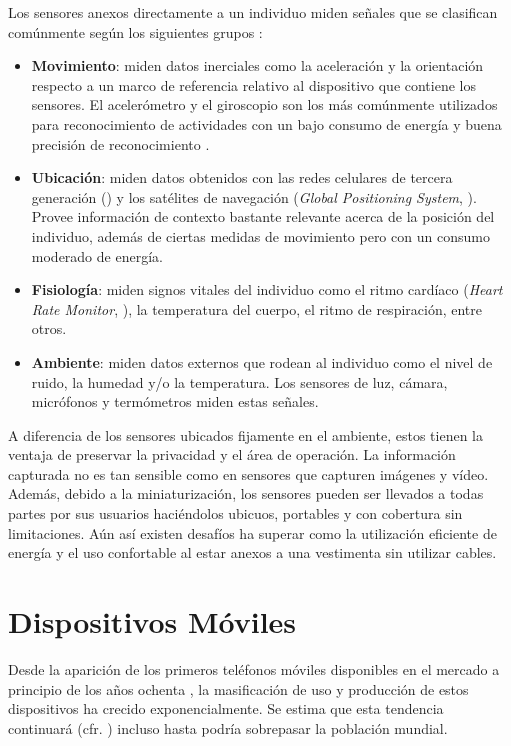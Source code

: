 Los sensores anexos directamente a un individuo miden señales que
se clasifican comúnmente según los siguientes grupos \cite{LaraLabrador2013}:
\begin{itemize}
\item \textbf{Movimiento}: miden datos inerciales como la aceleración y
la orientación respecto a un marco de referencia relativo al dispositivo
que contiene los sensores. El acelerómetro y el giroscopio son los
más comúnmente utilizados para reconocimiento de actividades con un
bajo consumo de energía y buena precisión de reconocimiento \cite{Bao2004,LaraLabrador2012}.
\item \textbf{Ubicación}: miden datos obtenidos con las redes celulares
de tercera generación () y los satélites de navegación (\emph{Global
Positioning System}, ). Provee información de contexto
bastante relevante acerca de la posición del individuo, además de
ciertas medidas de movimiento pero con un consumo moderado de energía.
\item \textbf{Fisiología}: miden signos vitales del individuo como el ritmo
cardíaco (\emph{Heart Rate Monitor},\emph{ }), la temperatura
del cuerpo, el ritmo de respiración, entre otros.
\item \textbf{Ambiente}: miden datos externos que rodean al individuo como
el nivel de ruido, la humedad y/o la temperatura. Los sensores de
luz, cámara, micrófonos y termómetros miden estas señales. 
\end{itemize}
A diferencia de los sensores ubicados fijamente en el ambiente, estos
tienen la ventaja de preservar la privacidad y el área de operación.
La información capturada no es tan sensible como en sensores que capturen
imágenes y vídeo. Además, debido a la miniaturización, los sensores
pueden ser llevados a todas partes por sus usuarios haciéndolos ubicuos,
portables y con cobertura sin limitaciones. Aún así existen desafíos
ha superar como la utilización eficiente de energía y el uso confortable
al estar anexos a una vestimenta sin utilizar cables.

\section{Dispositivos Móviles}

\label{sec24:dispositivos-moviles} Desde la aparición de los primeros
teléfonos móviles disponibles en el mercado a principio de los años
ochenta \cite{Tanenbaum2010}, la masificación de uso y producción
de estos dispositivos ha crecido exponencialmente. Se estima que esta
tendencia continuará (cfr. \cite{Ekholm2011}) incluso hasta podría
sobrepasar la población mundial.

